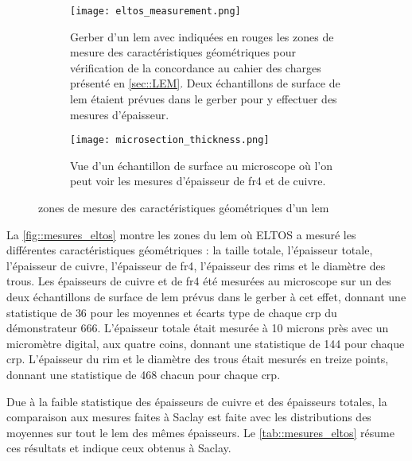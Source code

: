                 \begin{figure}[htpb]
                    \begin{subfigure}[t]{0.68\textwidth}
                        \texttt{[image: eltos\_measurement.png]}
                        \caption{Gerber d'un \gls{lem} avec indiquées en rouges les zones de mesure des caractéristiques géométriques pour vérification de la concordance au cahier des charges présenté en \autoref{sec::LEM}. Deux échantillons de surface de \gls{lem} étaient prévues dans le gerber pour y effectuer des mesures d'épaisseur.}
                    \end{subfigure}
                    \hfill
                    \begin{subfigure}[t]{0.3\textwidth}
                        \texttt{[image: microsection\_thickness.png]}
                        \caption{Vue d'un échantillon de surface au microscope où l'on peut voir les mesures d'épaisseur de \gls{fr4} et de cuivre.}
                        \label{fig::microsection}
                    \end{subfigure}
                    \caption[zones de mesure des caractéristiques géométriques d'un \gls{lem}]{zones de mesure des caractéristiques géométriques d'un \gls{lem}}
                    \label{fig::mesures_eltos}
                \end{figure}
            
                La \autoref{fig::mesures_eltos} montre les zones du \gls{lem} où ELTOS a mesuré les différentes caractéristiques géométriques : la taille totale, l'épaisseur totale, l'épaisseur de cuivre, l'épaisseur de \gls{fr4}, l'épaisseur des rims et le diamètre des trous. Les épaisseurs de cuivre et de \gls{fr4} été mesurées au microscope sur un des deux échantillons de surface de \gls{lem} prévus dans le gerber à cet effet, donnant une statistique de $36$ pour les moyennes et écarts type de chaque \gls{crp} du démonstrateur 666. L'épaisseur totale était mesurée à 10 microns près avec un micromètre digital, aux quatre coins, donnant une statistique de 144 pour chaque \gls{crp}. L'épaisseur du rim et le diamètre des trous était mesurés en treize points, donnant une statistique de 468 chacun pour chaque \gls{crp}.
                
                Due à la faible statistique des épaisseurs de cuivre et des épaisseurs totales, la comparaison aux mesures faites à Saclay est faite avec les distributions des moyennes sur tout le \gls{lem} des mêmes épaisseurs. Le \autoref{tab::mesures_eltos} résume ces résultats et indique ceux obtenus à Saclay.
                
